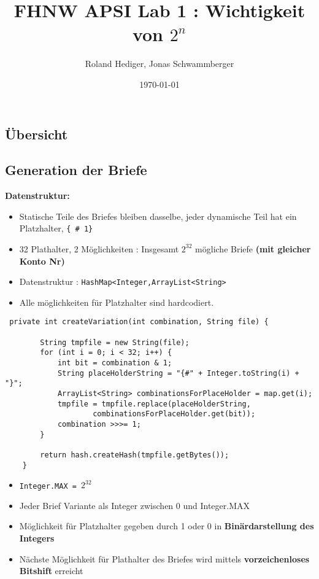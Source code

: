 \documentclass{beamer}
\begin{document}
\title{FHNW APSI Lab 1 : Wichtigkeit von $2^n$}   
\author{Roland Hediger, Jonas Schwammberger} 

\date{\today} 

\frame{\titlepage} 

\begin{frame}
\section*{Übersicht}
\tableofcontents
\end{frame} 

\begin{frame}
\section{Generation der Briefe}
\large \textbf{Datenstruktur:}
\begin{itemize}
 \item Statische Teile des Briefes bleiben dasselbe, jeder dynamische Teil hat ein Platzhalter, \texttt{\{ \# 1\}}
 \item 32 Plathalter, 2 Möglichkeiten : Insgesamt $2^{32}$ mögliche Briefe \textbf{(mit gleicher Konto Nr)}
 \item Datenstruktur : \texttt{HashMap<Integer,ArrayList<String>}
 \item  Alle möglichkeiten für Platzhalter sind hardcodiert.
\end{itemize}
\end{frame}

\begin{frame}[fragile]
\begin{lstlisting}
 private int createVariation(int combination, String file) {

		String tmpfile = new String(file);
		for (int i = 0; i < 32; i++) {
			int bit = combination & 1;
			String placeHolderString = "{#" + Integer.toString(i) + "}";
			ArrayList<String> combinationsForPlaceHolder = map.get(i);
			tmpfile = tmpfile.replace(placeHolderString,
					combinationsForPlaceHolder.get(bit));
			combination >>>= 1;
		}

		return hash.createHash(tmpfile.getBytes());
	}
\end{lstlisting}
\end{frame}
\begin{frame}
 \begin{itemize}
  \item \texttt{Integer.MAX = $2^{32}$}
  \item Jeder Brief Variante als Integer zwischen 0 und Integer.MAX
  \item Möglichkeit für Platzhalter gegeben durch 1 oder 0 in  \textbf{Binärdarstellung des Integers}
  \item Nächste Möglichkeit für Plathalter des Briefes wird mittels \textbf{vorzeichenloses Bitshift} erreicht
 \end{itemize}

\end{frame}
\end{document}
